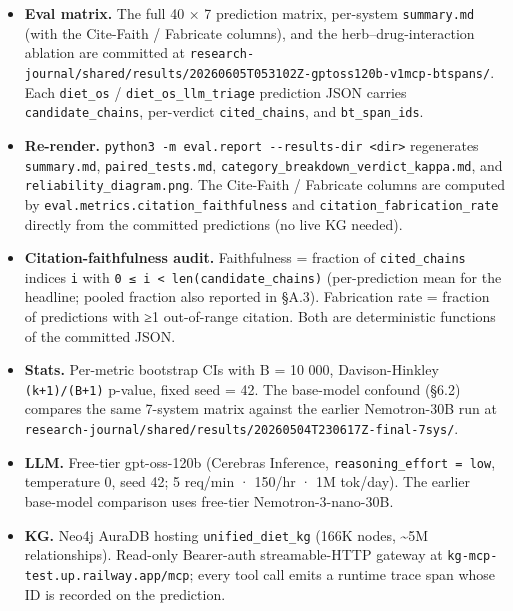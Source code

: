 \documentclass[
]{article}
\providecommand{\tightlist}{%
  \setlength{\itemsep}{0pt}\setlength{\parskip}{0pt}}
\begin{document}
\begin{itemize}
\tightlist
\item
  \textbf{Eval matrix.} The full 40 × 7 prediction matrix, per-system
  \texttt{summary.md} (with the Cite-Faith / Fabricate columns), and the
  herb--drug-interaction ablation are committed at
  \texttt{research-journal/shared/results/20260605T053102Z-gptoss120b-v1mcp-btspans/}.
  Each \texttt{diet\_os} / \texttt{diet\_os\_llm\_triage} prediction
  JSON carries \texttt{candidate\_chains}, per-verdict
  \texttt{cited\_chains}, and \texttt{bt\_span\_ids}.
\item
  \textbf{Re-render.}
  \texttt{python3\ -m\ eval.report\ -\/-results-dir\ \textless{}dir\textgreater{}}
  regenerates \texttt{summary.md}, \texttt{paired\_tests.md},
  \texttt{category\_breakdown\_verdict\_kappa.md}, and
  \texttt{reliability\_diagram.png}. The Cite-Faith / Fabricate columns
  are computed by \texttt{eval.metrics.citation\_faithfulness} and
  \texttt{citation\_fabrication\_rate} directly from the committed
  predictions (no live KG needed).
\item
  \textbf{Citation-faithfulness audit.} Faithfulness = fraction of
  \texttt{cited\_chains} indices \texttt{i} with
  \texttt{0\ ≤\ i\ \textless{}\ len(candidate\_chains)} (per-prediction
  mean for the headline; pooled fraction also reported in §A.3).
  Fabrication rate = fraction of predictions with ≥1 out-of-range
  citation. Both are deterministic functions of the committed JSON.
\item
  \textbf{Stats.} Per-metric bootstrap CIs with B = 10 000,
  Davison-Hinkley \texttt{(k+1)/(B+1)} p-value, fixed seed = 42. The
  base-model confound (§6.2) compares the same 7-system matrix against
  the earlier Nemotron-30B run at
  \texttt{research-journal/shared/results/20260504T230617Z-final-7sys/}.
\item
  \textbf{LLM.} Free-tier gpt-oss-120b (Cerebras Inference,
  \texttt{reasoning\_effort\ =\ low}, temperature 0, seed 42; 5 req/min
  · 150/hr · 1M tok/day). The earlier base-model comparison uses
  free-tier Nemotron-3-nano-30B.
\item
  \textbf{KG.} Neo4j AuraDB hosting \texttt{unified\_diet\_kg} (166K
  nodes, \textasciitilde5M relationships). Read-only Bearer-auth
  streamable-HTTP gateway at \texttt{kg-mcp-test.up.railway.app/mcp};
  every tool call emits a runtime trace span whose ID is recorded on the
  prediction.
\end{itemize}
\end{document}
